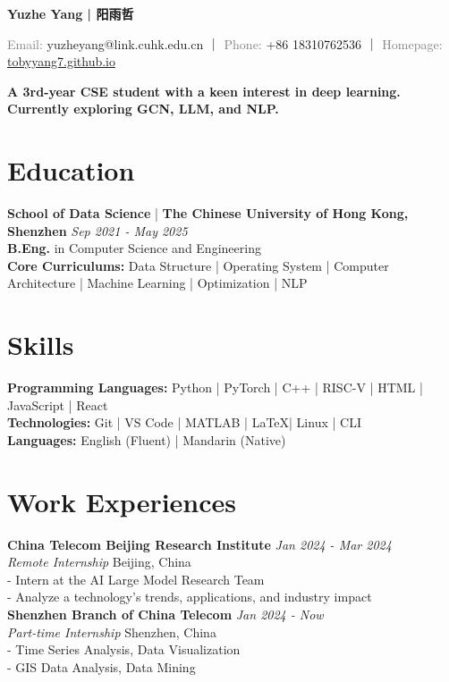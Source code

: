 \documentclass[a4paper,10pt]{article}
\newcommand{\contact}[2]{\noindent\textcolor{gray}{#1:} #2}
\begin{document}
\newcommand{\name}[1]{\noindent\textbf{\LARGE #1}\vspace{0.5em}}

\begin{center}
    
\name{Yuzhe Yang | 阳雨哲}

\contact{Email}{yuzheyang@link.cuhk.edu.cn} ｜ \contact{Phone}{+86 18310762536} ｜ \contact{Homepage}{\href{https://tobyyang7.github.io/}{tobyyang7.github.io}}

\vspace*{.2em}
\textbf{A 3rd-year CSE student with a keen interest in deep learning. Currently exploring GCN, LLM, and NLP.\\}

\end{center}

\section*{Education}
\textbf{School of Data Science} | \textbf{The Chinese University of Hong Kong, Shenzhen} \hfill \textit{Sep 2021 - May 2025}\\
\textbf{B.Eng.} in Computer Science and Engineering\\
\textbf{Core Curriculums:}
Data Structure | Operating System |  Computer Architecture |  Machine Learning | Optimization |  NLP


\section*{Skills}
\textbf{Programming Languages:} Python | PyTorch | C++ | RISC-V | HTML | JavaScript |  React\\
\textbf{Technologies:} Git | VS Code | MATLAB | \LaTeX | Linux | CLI\\
\textbf{Languages:} English (Fluent) | Mandarin (Native)

\section*{Work Experiences}
\textbf{China Telecom Beijing Research Institute} \hfill \textit{Jan 2024 - Mar 2024}\\
\textit{Remote Internship} \hfill Beijing, China\\
- Intern at the AI Large Model Research Team\\
- Analyze a technology's trends, applications, and industry impact\\
\textbf{Shenzhen Branch of China Telecom} \hfill \textit{Jan 2024 - Now}\\
\textit{Part-time Internship} \hfill Shenzhen, China\\
- Time Series Analysis, Data Visualization\\
- GIS Data Analysis, Data Mining
\end{document}
